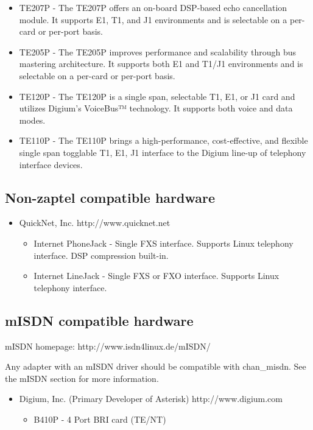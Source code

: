 \begin{itemize}
\begin{itemize}
\begin{itemize}
       \item TE207P - The TE207P offers an on-board DSP-based echo cancellation module. It supports E1, T1, and J1 environments and is selectable on a per-card or per-port basis.
       \item TE205P - The TE205P improves performance and scalability through bus mastering architecture. It supports both E1 and T1/J1 environments and is selectable on a per-card or per-port basis.
       \item TE120P - The TE120P is a single span, selectable T1, E1, or J1 card and utilizes Digium's VoiceBus™ technology. It supports both voice and data modes.	     	
       \item TE110P - The TE110P brings a high-performance, cost-effective, and flexible single span togglable T1, E1, J1 interface to the Digium line-up of telephony interface devices.
     \end{itemize}
  \end{itemize}
\end{itemize}

\subsection{Non-zaptel compatible hardware}

\begin{itemize}
  \item QuickNet, Inc. 
        http://www.quicknet.net
  \begin{itemize}
    \item Internet PhoneJack - Single FXS interface.  Supports Linux telephony
          interface.  DSP compression built-in.

    \item Internet LineJack - Single FXS or FXO interface.  Supports Linux 
          telephony interface.
  \end{itemize}
\end{itemize}

\subsection{mISDN compatible hardware}

mISDN homepage:  http://www.isdn4linux.de/mISDN/

Any adapter with an mISDN driver should be compatible with
chan\_misdn. See the mISDN section for more information.

\begin{itemize}
  \item Digium, Inc. (Primary Developer of Asterisk) 
	http://www.digium.com
  \begin{itemize}
    \item B410P - 4 Port BRI card (TE/NT)
   \end{itemize}
\end{itemize}

